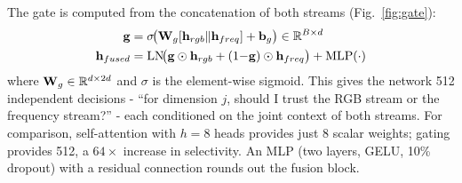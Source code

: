 The gate is computed from the concatenation of both streams (Fig.~\ref{fig:gate}):
\begin{align}
    \mathbf{g} &= \sigma\!\big(\mathbf{W}_g [\mathbf{h}_{rgb} \| \mathbf{h}_{freq}] + \mathbf{b}_g\big) \in \mathbb{R}^{B \times d} \label{eq:gate}\\
    \mathbf{h}_{fused} &= \text{LN}\!\big(\mathbf{g} \odot \mathbf{h}_{rgb} + (1{-}\mathbf{g}) \odot \mathbf{h}_{freq}\big) + \text{MLP}(\cdot) \label{eq:fused}
\end{align}
where $\mathbf{W}_g \in \mathbb{R}^{d \times 2d}$ and $\sigma$ is the element-wise sigmoid. This gives the network 512 independent decisions - ``for dimension $j$, should I trust the RGB stream or the frequency stream?'' - each conditioned on the joint context of both streams. For comparison, self-attention with $h = 8$ heads provides just 8 scalar weights; gating provides 512, a $64\times$ increase in selectivity. An MLP (two layers, GELU, 10\% dropout) with a residual connection rounds out the fusion block.


